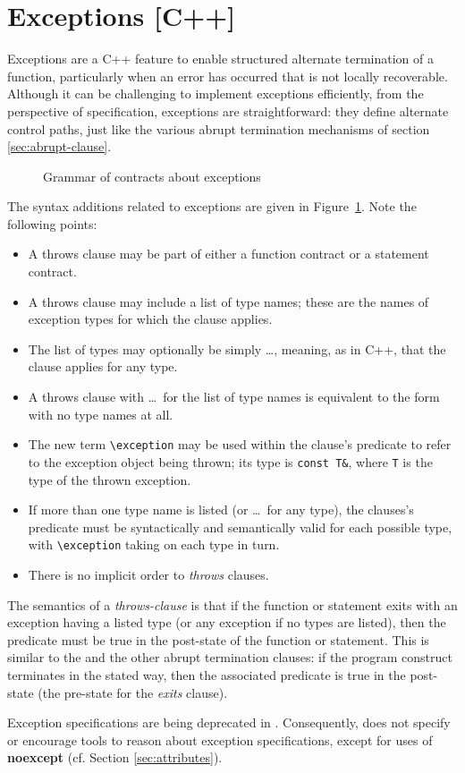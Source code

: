 \section{Exceptions [C++]}
\label{sec:exceptions}

Exceptions are a C++ feature to enable structured alternate termination of a function, particularly when an error has occurred that is not locally recoverable. Although it can be challenging to implement exceptions efficiently, from the perspective of specification, exceptions are straightforward: they define alternate control paths, just like the various abrupt termination mechanisms of section \ref{sec:abrupt-clause}.

\begin{figure}[t]
	\begin{cadre}
		
	\end{cadre}
	\caption{Grammar of contracts about exceptions}
	\label{fig:gram:throws-clause}
\end{figure}


The syntax additions related to exceptions are given in 
Figure~\ref{fig:gram:throws-clause}. Note the following points:
\begin{itemize}
\item A throws clause may be part of either a function contract or a statement contract.
\item A throws clause may include a list of type names; these are the names of exception types for which the
clause applies.
\item The list of types may optionally be simply \ldots, meaning, as in C++, that the clause applies for any type.
\item A throws clause with \ldots~for the list of type names is equivalent to the form with no type names at all.
\item The new term \lstinline|\exception| may be used within the clause's predicate to refer to the exception object being thrown; its type is \lstinline|const T&|, where \lstinline|T| is the type of the thrown exception.
\item If more than one type name is listed (or \ldots~for any type), the clauses's predicate must be syntactically and semantically valid for each possible type, with \lstinline|\exception| taking on each type in turn.
\item There is no implicit order to \textsl{throws} clauses.
\end{itemize}
The semantics of a \textsl{throws-clause} is that if the function or statement exits with an exception having a listed type (or any exception if no types are listed), then the predicate must be true in the post-state of the function or statement. This is similar to the \ensures and the other abrupt termination clauses: if the program construct terminates in the stated way, then the associated predicate is true in the post-state (the pre-state for the \textsl{exits} clause).

Exception specifications are being deprecated in \lang. Consequently, \NAME does not specify or encourage tools to reason about \lang exception specifications, except for  uses of \textbf{noexcept} (cf. Section \ref{sec:attributes}).

